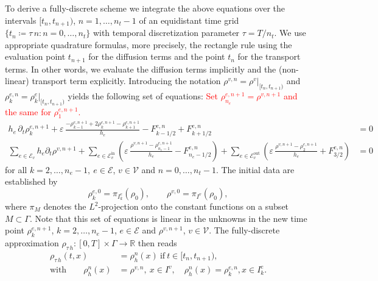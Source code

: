 To derive a fully-discrete scheme we integrate the above equations over the intervals $[t_n,t_{n+1})$, $n=1,\ldots,n_t-1$ of an equidistant time grid $\{t_n\coloneqq \tau\,n\colon n=0,\ldots,n_t\}$ with temporal discretization parameter $\tau = T/n_t$. We use appropriate quadrature formulas, more precisely, the rectangle rule using the evaluation point $t_{n+1}$ for the diffusion terms and the point $t_n$ for the transport terms. In other words, we evaluate the diffusion terms implicitly and the (non-linear) transport term explicitly. Introducing the notation $\rho^{v,n} = \rho^v|_{[t_n,t_{n+1})}$ and $\rho_k^{e,n} = \rho_k^e|_{[t_n,t_{n+1})}$ yields the following set of equations: \textcolor{red}{Set $\rho^{e,n+1}_{n_e} = \rho^{v,n+1}$ and the same for $\rho^{e,n+1}_1$.}
\begin{subequations}
    \label{eq:fully_discrete_fvm}
    \begin{align}
        h_e\,\partial_t \rho_k^{e,n+1} + \varepsilon\,\frac{-\rho_{k-1}^{e,n+1} +
        2\rho_k^{e,n+1} - \rho_{k+1}^{e,n+1}}{h_e} - F_{k-1/2}^{e,n} +
        F_{k+1/2}^{e,n} &= 0 \\	
        \sum_{e\in \mathcal{E}_v} h_e\partial_t\rho^{v,n+1}
        + \sum_{e\in \mathcal{E}_v^{\text{in}}}
        \left(\varepsilon\,\frac{\rho^{v,n+1}-\rho_{n_e-1}^{e,n+1}}{h_e} -
        F^{e,n}_{n_e-1/2}\right)
        + \sum_{e\in \mathcal{E}_v^{\text{out}}}
        \left(\varepsilon\,\frac{\rho^{v,n+1}-\rho_2^{e,n+1}}{h_e} + F^{e,n}_{3/2}\right)
        &= 0
    \end{align}
\end{subequations}
for all $k=2,\ldots,n_e-1,\ e\in \mathcal{E}$, $v\in \mathcal{V}$ and $n=0,\ldots,n_t-1$. The initial data are established by
\begin{equation*}
	\rho_k^{e,0}=\pi_{I_k^e}(\rho_0),\qquad \rho^{v,0} = \pi_{I^v}(\rho_0),
\end{equation*}
where $\pi_M$ denotes the $L^2$-projection onto the constant functions on a subset $M\subset \Gamma$. Note that this set of equations is linear in the unknowns in the new time point $\rho_k^{e,n+1}$, $k=2,\ldots,n_e-1$, $e\in \mathcal{E}$ and $\rho^{v,n+1}$, $v\in \mathcal{V}$. The fully-discrete approximation $\rho_{\tau\,h}\colon [0,T]\times \Gamma\to \mathbb{R}$ then reads
\begin{align*}
	\rho_{\tau\,h}(t,x) &= \rho_h^n(x)\ \text{if}\ t\in [t_n,t_{n+1}),\\
	\text{with}\qquad \rho_h^n(x) &= \rho^{v,n},\ x\in I^v,\quad \rho_h^n(x)
	= \rho_k^{e,n}, x\in I_k^e.
\end{align*}

